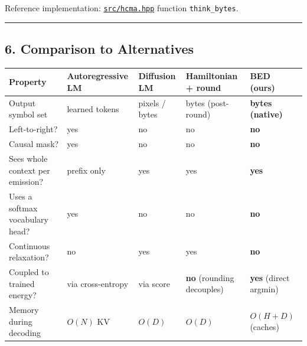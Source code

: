 \documentclass[
  11pt,
  a4paper,
]{article}
\begin{document}
Reference implementation: \href{../src/hcma.hpp}{\texttt{src/hcma.hpp}}
function \texttt{think\_bytes}.

\begin{center}\rule{0.5\linewidth}{0.5pt}\end{center}

\subsection{6. Comparison to
Alternatives}\label{comparison-to-alternatives}

\begin{longtable}[]{@{}
  >{\raggedright\arraybackslash}p{}
  >{\raggedright\arraybackslash}p{}
  >{\raggedright\arraybackslash}p{}
  >{\raggedright\arraybackslash}p{}
  >{\raggedright\arraybackslash}p{}@{}}
\toprule\noalign{}
\begin{minipage}[b]{\linewidth}\raggedright
Property
\end{minipage} & \begin{minipage}[b]{\linewidth}\raggedright
Autoregressive LM
\end{minipage} & \begin{minipage}[b]{\linewidth}\raggedright
Diffusion LM
\end{minipage} & \begin{minipage}[b]{\linewidth}\raggedright
Hamiltonian + round
\end{minipage} & \begin{minipage}[b]{\linewidth}\raggedright
\textbf{BED (ours)}
\end{minipage} \\
\midrule\noalign{}
\endhead
\bottomrule\noalign{}
\endlastfoot
Output symbol set & learned tokens & pixels / bytes & bytes (post-round)
& \textbf{bytes (native)} \\
Left-to-right? & yes & no & no & \textbf{no} \\
Causal mask? & yes & no & no & \textbf{no} \\
Sees whole context per emission? & prefix only & yes & yes &
\textbf{yes} \\
Uses a softmax vocabulary head? & yes & no & no & \textbf{no} \\
Continuous relaxation? & no & yes & yes & \textbf{no} \\
Coupled to trained energy? & via cross-entropy & via score & \textbf{no}
(rounding decouples) & \textbf{yes} (direct argmin) \\
Memory during decoding & \(O(N)\) KV & \(O(D)\) & \(O(D)\) &
\(O(H + D)\) (caches) \\
\end{longtable}
\end{document}
